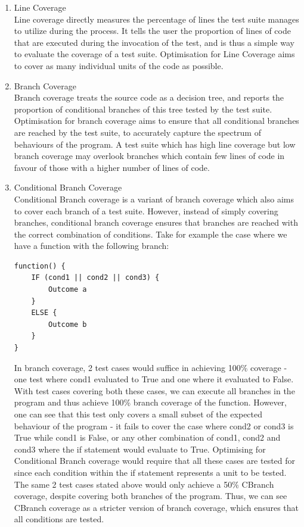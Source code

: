 \documentclass[titlepage]{article}
\begin{document}
\begin{enumerate}
	\item Line Coverage	\\
Line coverage directly measures the percentage of lines the test suite manages to utilize during the process. It tells the user the proportion of lines of code that are executed during the invocation of the test, and is thus a simple way to evaluate the coverage of a test suite. Optimisation for Line Coverage aims to cover as many individual units of the code as possible.
 
	\item Branch Coverage \\
Branch coverage treats the source code as a decision tree, and reports the proportion of conditional branches of this tree tested by the test suite. Optimisation for branch coverage aims to ensure that all conditional branches are reached by the test suite, to accurately capture the spectrum of behaviours of the program. A test suite which has high line coverage but low branch coverage may overlook branches which contain few lines of code in favour of those with a higher number of lines of code. 

	\item Conditional Branch Coverage \\
Conditional Branch coverage \cite{testingtextbook} is a variant of branch coverage which also aims to cover each branch of a test suite. However, instead of simply covering branches, conditional branch coverage ensures that branches are reached with the correct combination of conditions. Take for example the case where we have a function with the following branch:
\begin{lstlisting}
function() {
	IF (cond1 || cond2 || cond3) {
		Outcome a
	}
	ELSE {
		Outcome b
	}
}
\end{lstlisting}
In branch coverage, 2 test cases would suffice in achieving 100\% coverage - one test where cond1 evaluated to True and one where it evaluated to False. With test cases covering both these cases, we can execute all branches in the program and thus achieve 100\% branch coverage of the function. However, one can see that this test only covers a small subset of the expected behaviour of the program - it fails to cover the case where cond2 or cond3 is True  while cond1 is False, or any other combination of cond1, cond2 and cond3 where the if statement would evaluate to True. Optimising for Conditional Branch coverage would require that all these cases are tested for since each condition within the if statement represents a unit to be tested. The same 2 test cases stated above would only achieve a 50\% CBranch coverage, despite covering both branches of the program. Thus, we can see CBranch coverage as a stricter version of branch coverage, which ensures that all conditions are tested.




\end{enumerate}
\end{document}
